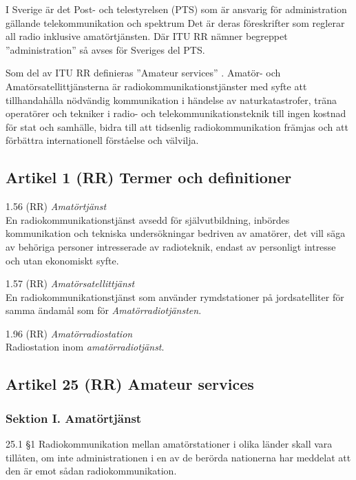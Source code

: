 I Sverige är det Post- och telestyrelsen (PTS) som är ansvarig för
administration gällande telekommunikation och spektrum Det är deras
föreskrifter som reglerar all radio inklusive amatörtjänsten.
Där ITU RR nämner begreppet ''administration'' så avses för Sveriges del PTS.

Som del av ITU RR definieras ''Amateur services'' \cite[Article 25]{ITU-RR}.
Amatör- och Amatörsatellittjänsterna är radiokommunikationstjänster
med syfte att tillhandahålla nödvändig kommunikation i händelse av
naturkatastrofer, träna operatörer och tekniker i radio- och
telekommunikationsteknik till ingen kostnad för stat och samhälle,
bidra till att tidsenlig radiokommunikation främjas och att förbättra
internationell förståelse och välvilja.

\subsection{Artikel 1 (RR) Termer och definitioner}
\label{amatörradio definitioner}

1.56 (RR) \emph{Amatörtjänst} \cite[1.56]{ITU-RR}\\
En radiokommunikationstjänst avsedd för självutbildning, inbördes
kommunikation och tekniska undersökningar bedriven av amatörer, det
vill säga av behöriga personer intresserade av radioteknik,
endast av personligt intresse och utan ekonomiskt syfte.

1.57 (RR) \emph{Amatörsatellittjänst} \cite[1.57]{ITU-RR}\\
En radiokommunikationstjänst som använder rymdstationer på
jordsatelliter för samma ändamål som för \emph{Amatörradiotjänsten}.

1.96 (RR) \emph{Amatörradiostation} \cite[1.96]{ITU-RR}\\
Radiostation inom \emph{amatörradiotjänst}.

\subsection{Artikel 25 (RR) Amateur services}

\subsubsection{Sektion I. Amatörtjänst}
25.1 \S1 Radiokommunikation mellan amatörstationer i olika länder
skall vara tillåten, om inte administrationen i en av de berörda
nationerna har meddelat att den är emot sådan radiokommunikation.
\cite[25.1]{ITU-RR}

